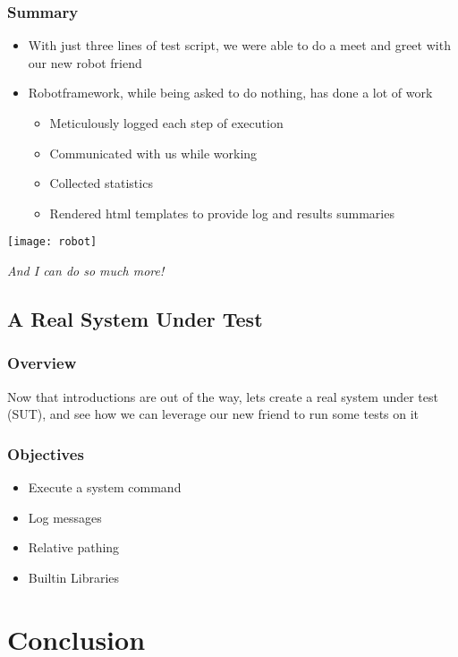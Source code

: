 \documentclass[xcolor=table,handout]{beamer}
\begin{document}
\begin{frame}\frametitle{Summary}
    \begin{itemize}
        \item With just three lines of test script, we were able to do a meet and greet with our new robot friend
        \item Robotframework, while being asked to do nothing, has done a lot of work
            \begin{itemize}\footnotesize
                \item Meticulously logged each step of execution
                \item Communicated with us while working
                \item Collected statistics
                \item Rendered html templates to provide log and results summaries
            \end{itemize}
    \end{itemize}
    \begin{center}
    \texttt{[image: robot]}
        
    \emph{And I can do so much more!}
    \end{center}
\end{frame}


\subsection{A Real System Under Test}

\begin{frame}\frametitle{Overview}
    Now that introductions are out of the way, lets create a real system under test (SUT), and see how we can leverage our new friend to run some tests on it
\end{frame}

\begin{frame}\frametitle{Objectives}
    \begin{itemize}
        \item Execute a system command
        \item Log messages
        \item Relative pathing
        \item Builtin Libraries
    \end{itemize}
\end{frame}

\section{Conclusion}
\end{document}
